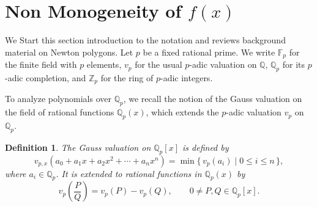 \documentclass[table]{amsart}
\newtheorem{definition}[theorem]{Definition}
\newcommand{\Z}{\mathbb{Z}}
\newcommand{\Q}{\mathbb{Q}}
\newcommand{\F}{\mathbb{F}}
\numberwithin{equation}{section}
\begin{document}
\section{Non Monogeneity of \texorpdfstring{$f(x)$}{f(x)}}
We Start this section introduction to the notation and reviews background material on Newton polygons. Let $p$ be a fixed rational prime. We write $\F_p$ for the finite field with $p$ elements,
$v_p$ for the usual $p$-adic valuation on $\Q$, $\Q_p$ for its $p$-adic completion, and $\Z_p$
for the ring of $p$-adic integers.

To analyze polynomials over $\Q_p$, we recall the notion of the Gauss valuation on the field
of rational functions $\Q_p(x)$, which extends the $p$-adic valuation $v_p$ on $\Q_p$.

\begin{definition}\label{def:Gauss}
The \emph{Gauss valuation} on $\Q_p[x]$ is defined by
\[
v_{p,x}\!\left(a_0+a_1x+a_2x^2+\cdots+a_nx^n\right)
= \min\{\,v_p(a_i)\mid 0\le i\le n\,\},
\]
where $a_i\in\Q_p$.
It is extended to rational functions in $\Q_p(x)$ by
\[
v_p\!\left(\frac{P}{Q}\right)=v_p(P)-v_p(Q),
\qquad 0\ne P,Q\in\Q_p[x].
\]
\end{definition}
\end{document}

